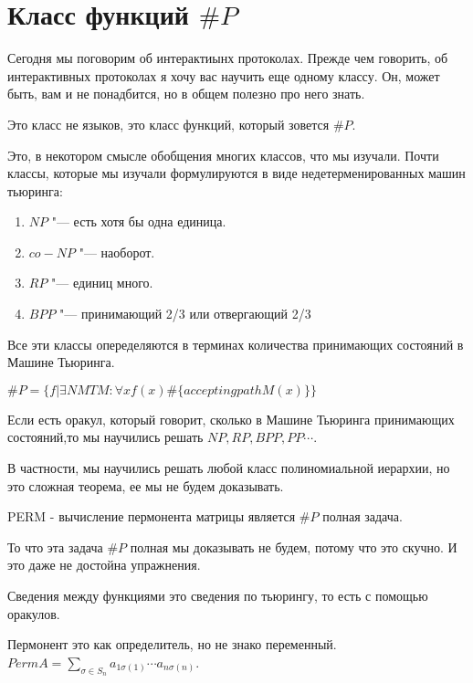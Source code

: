 ﻿\section{Класс функций $\#P$}
Сегодня мы поговорим об интерактиынх протоколах. Прежде чем говорить, 
об интерактивных протоколах я хочу вас научить еще одному классу. Он, может 
быть, вам и не понадбится, но в общем полезно про него знать.  

Это класс не языков, это класс функций, который зовется $\#P$.

Это, в некотором смысле обобщения многих классов, что мы изучали. Почти классы, 
которые мы изучали формулируются в виде недетерменированных машин тьюринга: 
\begin{enumerate}
\item $NP$ "--- есть хотя бы одна единица. 
\item $co-NP$ "--- наоборот.
\item $RP$ "--- единиц много. 
\item $BPP$ "--- принимающий 2/3 или отвергающий 2/3
\end{enumerate}

Все эти классы опеределяются в терминах количества
принимающих состояний в Машине Тьюринга. 

\begin{Def}
$\#P = \{f | \exists NMT M \colon \forall x f(x) \#\{accepting path M(x)\}\}$\\
\end{Def}

Если есть оракул, который говорит, сколько в Машине Тьюринга принимающих состояний,то
мы научились решать $NP, RP, BPP, PP\cdots$.

В частности, мы научились решать любой класс полиномиальной иерархии, 
но это сложная теорема, ее мы не будем доказывать. 

\begin{exmp}
PERM - вычисление пермонента матрицы является $\#P$ полная задача.

То что эта задача $\#P$ полная мы доказывать не будем, потому 
что это скучно. И это даже не достойна упражнения.

Сведения между функциями это сведения по тьюрингу, то
есть с помощью оракулов.

\begin{Def}
Пермонент это как определитель, но не знако переменный.
$Perm A = \sum_{\sigma \in S_n}a_{1\sigma(1)} \cdots a_{n\sigma(n)}$. 
\end{Def}
\end{exmp}
 
